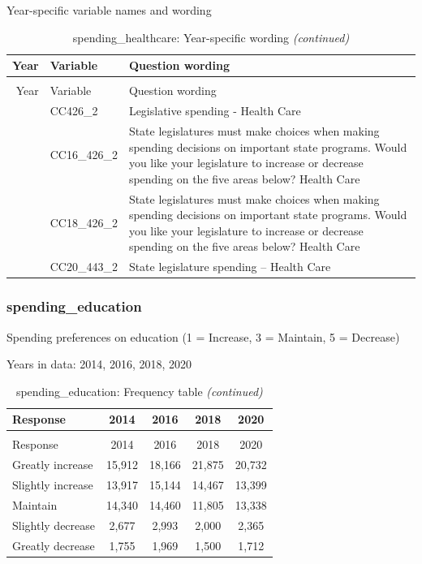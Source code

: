 \documentclass[
  12pt]{article}
\begin{document}
Year-specific variable names and
wording\begingroup\fontsize{11}{13}\selectfont

\begin{longtable}[t]{rl>{\raggedright\arraybackslash}p{10cm}}
\caption{\label{tab:unnamed-chunk-5}spending\_healthcare: Year-specific wording}\\
\toprule
Year & Variable & Question wording\\
\midrule
\endfirsthead
\caption[]{spending\_healthcare: Year-specific wording \textit{(continued)}}\\
\toprule
Year & Variable & Question wording\\
\midrule
\endhead

\endfoot
\bottomrule
\endlastfoot
2014 & CC426\_2 & Legislative spending - Health Care\\
\addlinespace
2016 & CC16\_426\_2 & State legislatures must make choices when making spending decisions on important state programs. Would you like your legislature to increase or decrease spending on the five areas below? Health Care\\
\addlinespace
2018 & CC18\_426\_2 & State legislatures must make choices when making spending decisions on important state programs. Would you like your legislature to increase or decrease spending on the five areas below? Health Care\\
\addlinespace
2020 & CC20\_443\_2 & State legislature spending -- Health Care\\*
\end{longtable}
\endgroup{}

\hypertarget{spending_education}{%
\subsubsection{spending\_education}\label{spending_education}}

Spending preferences on education (1 = Increase, 3 = Maintain, 5 =
Decrease)

Years in data: 2014, 2016, 2018,
2020\begingroup\fontsize{10}{12}\selectfont

\begin{longtable}[t]{lcccc}
\caption{\label{tab:unnamed-chunk-5}spending\_education: Frequency table}\\
\toprule
Response & 2014 & 2016 & 2018 & 2020\\
\midrule
\endfirsthead
\caption[]{spending\_education: Frequency table \textit{(continued)}}\\
\toprule
Response & 2014 & 2016 & 2018 & 2020\\
\midrule
\endhead

\endfoot
\bottomrule
\endlastfoot
Greatly increase & 15,912 & 18,166 & 21,875 & 20,732\\
Slightly increase & 13,917 & 15,144 & 14,467 & 13,399\\
Maintain & 14,340 & 14,460 & 11,805 & 13,338\\
Slightly decrease & 2,677 & 2,993 & 2,000 & 2,365\\
Greatly decrease & 1,755 & 1,969 & 1,500 & 1,712\\*
\end{longtable}
\endgroup{}
\end{document}

